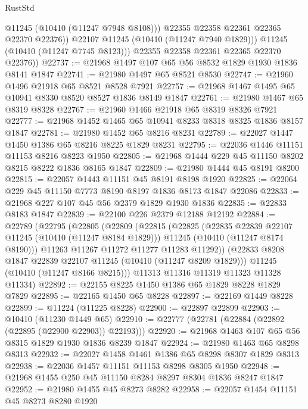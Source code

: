 \begin{lexlean}{RustStd}
\begin{coremodule}
                  @11245
                  (@10410 (@11247 @7948 @8108)))
                @22355
                @22358
                @22361
                @22365
                @22370
                @22376))
            @22107
            @11245
            (@10410 (@11247 @7940 @1829)))
          @11245
          (@10410 (@11247 @7745 @8123)))
        @22355
        @22358
        @22361
        @22365
        @22370
        @22376))
@22737 := @21968 @1497 @107 @65 @56 @8532 @1829 @1930 @1836 @8141 @1847
@22741 := @21980 @1497 @65 @8521 @8530
@22747 := @21960 @1496 @21918 @65 @8521 @8528 @7921
@22757 := @21968 @1467 @1495 @65 @10941 @8330 @8520 @8527 @1836 @8149 @1847
@22761 := @21980 @1467 @65 @8319 @8328
@22767 := @21960 @1466 @21918 @65 @8319 @8326 @7921
@22777 := @21968 @1452 @1465 @65 @10941 @8233 @8318 @8325 @1836 @8157 @1847
@22781 := @21980 @1452 @65 @8216 @8231
@22789 := @22027 @1447 @1450 @1386 @65 @8216 @8225 @1829 @8231
@22795 := @22036 @1446 @11151 @11153 @8216 @8223 @1950
@22805 := @21968 @1444 @229 @45 @11150 @8202 @8215 @8222 @1836 @8165 @1847
@22809 := @21980 @1444 @45 @8191 @8200
@22815 := @22057 @1443 @11151 @45 @8191 @8198 @1920
@22825 := @22064 @229 @45 @11150 @7773 @8190 @8197 @1836 @8173 @1847 @22086
@22833 := @21968 @227 @107 @45 @56 @2379 @1829 @1930 @1836
@22835 := @22833 @8183 @1847
@22839 := @22100 @226 @2379 @12188 @12192
@22884 := @22789
    (@22795
      (@22805
        (@22809
          (@22815
            (@22825
              (@22835 @22839 @22107 @11245 (@10410 (@11247 @8184 @1829)))
              @11245
              (@10410 (@11247 @8174 @8190)))
            @11263
            @11267
            @11272
            @11277
            @11283
            @11292))
        (@22833 @8208 @1847 @22839 @22107 @11245 (@10410 (@11247 @8209 @1829)))
        @11245
        (@10410 (@11247 @8166 @8215)))
      @11313
      @11316
      @11319
      @11323
      @11328
      @11334)
@22892 := @22155 @8225 @1450 @1386 @65 @1829 @8228 @1829 @7829
@22895 := @22165 @1450 @65 @8228
@22897 := @22169 @1449 @8228
@22899 := @11224 (@11225 @8228)
@22900 := @22897 @22899
@22903 := @10410 (@11230 @1449 @65)
@22910 := @22777 (@22781 (@22884 (@22892 (@22895 (@22900 @22903)) @22193)))
@22920 := @21968 @1463 @107 @65 @56 @8315 @1829 @1930 @1836 @8239 @1847
@22924 := @21980 @1463 @65 @8298 @8313
@22932 := @22027 @1458 @1461 @1386 @65 @8298 @8307 @1829 @8313
@22938 := @22036 @1457 @11151 @11153 @8298 @8305 @1950
@22948 := @21968 @1455 @250 @45 @11150 @8284 @8297 @8304 @1836 @8247 @1847
@22952 := @21980 @1455 @45 @8273 @8282
@22958 := @22057 @1454 @11151 @45 @8273 @8280 @1920

\end{coremodule}
\end{lexlean}

